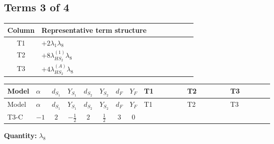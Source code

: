 \documentclass[8pt]{article}
\begin{document}
\begin{landscape}
\subsection*{Terms 3 of 4}
\begin{center}
\begin{tabular}{@{}c >{\raggedright\arraybackslash}p{0.82\linewidth}@{}}
\toprule
Column & Representative term structure \\
\midrule
T1 & \(\displaystyle +2 {\lambda_1} {\lambda_{8}}\) \\
\midrule
T2 & \(\displaystyle +8 {\lambda_{HS_2}^{(1)}} {\lambda_{8}}\) \\
\midrule
T3 & \(\displaystyle +4 {\lambda_{HS_2}^{(A)}} {\lambda_{8}}\) \\
\midrule
\bottomrule
\end{tabular}
\end{center}
\smallskip
\tiny
\begin{longtable}{@{}llcccccc >{\raggedright\arraybackslash}p{0.21\linewidth} >{\raggedright\arraybackslash}p{0.21\linewidth} >{\raggedright\arraybackslash}p{0.21\linewidth}@{}}
\toprule
Model & $\alpha$ & $d_{S_1}$ & $Y_{S_1}$ & $d_{S_2}$ & $Y_{S_2}$ & $d_F$ & $Y_F$ & T1 & T2 & T3 \\
\midrule
\endfirsthead
\toprule
Model & $\alpha$ & $d_{S_1}$ & $Y_{S_1}$ & $d_{S_2}$ & $Y_{S_2}$ & $d_F$ & $Y_F$ & T1 & T2 & T3 \\
\midrule
\endhead
T3-C & $-1$ & $2$ & $-\frac{1}{2}$ & $2$ & $\frac{1}{2}$ & $3$ & $0$ & \scriptsize\adjustbox{max width=\linewidth}{$\begin{gathered} +2 {\lambda_1} {\lambda_{8}}\end{gathered}$} & \scriptsize\adjustbox{max width=\linewidth}{$\begin{gathered} +8 {\lambda_{HS_2}^{(1)}} {\lambda_{8}}\end{gathered}$} & \scriptsize\adjustbox{max width=\linewidth}{$\begin{gathered} +4 {\lambda_{HS_2}^{(A)}} {\lambda_{8}}\end{gathered}$} \\
\midrule
\bottomrule
\end{longtable}
\clearpage
\noindent\textbf{Quantity: }$\lambda_{8}$\par\smallskip

\end{landscape}
\end{document}
